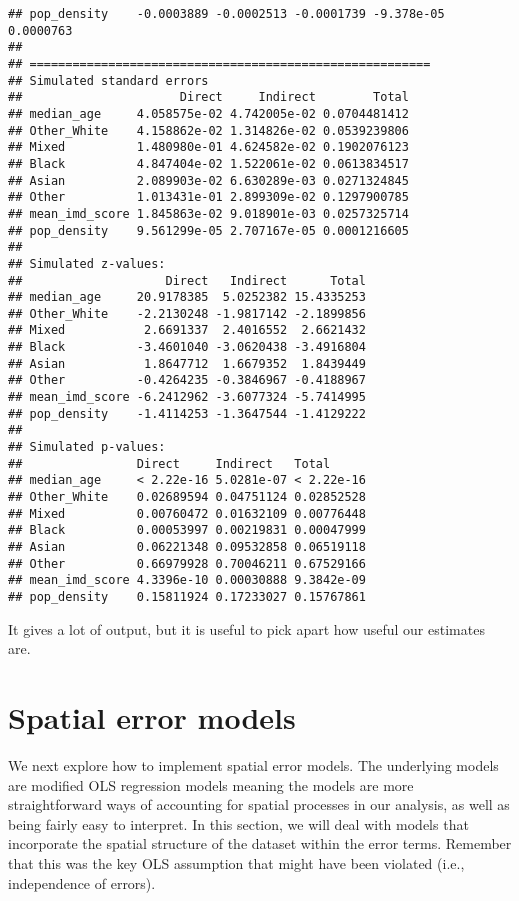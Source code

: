 \documentclass[
]{book}
\begin{document}
\begin{verbatim}
## pop_density    -0.0003889 -0.0002513 -0.0001739 -9.378e-05  0.0000763
## 
## ========================================================
## Simulated standard errors
##                      Direct     Indirect        Total
## median_age     4.058575e-02 4.742005e-02 0.0704481412
## Other_White    4.158862e-02 1.314826e-02 0.0539239806
## Mixed          1.480980e-01 4.624582e-02 0.1902076123
## Black          4.847404e-02 1.522061e-02 0.0613834517
## Asian          2.089903e-02 6.630289e-03 0.0271324845
## Other          1.013431e-01 2.899309e-02 0.1297900785
## mean_imd_score 1.845863e-02 9.018901e-03 0.0257325714
## pop_density    9.561299e-05 2.707167e-05 0.0001216605
## 
## Simulated z-values:
##                    Direct   Indirect      Total
## median_age     20.9178385  5.0252382 15.4335253
## Other_White    -2.2130248 -1.9817142 -2.1899856
## Mixed           2.6691337  2.4016552  2.6621432
## Black          -3.4601040 -3.0620438 -3.4916804
## Asian           1.8647712  1.6679352  1.8439449
## Other          -0.4264235 -0.3846967 -0.4188967
## mean_imd_score -6.2412962 -3.6077324 -5.7414995
## pop_density    -1.4114253 -1.3647544 -1.4129222
## 
## Simulated p-values:
##                Direct     Indirect   Total     
## median_age     < 2.22e-16 5.0281e-07 < 2.22e-16
## Other_White    0.02689594 0.04751124 0.02852528
## Mixed          0.00760472 0.01632109 0.00776448
## Black          0.00053997 0.00219831 0.00047999
## Asian          0.06221348 0.09532858 0.06519118
## Other          0.66979928 0.70046211 0.67529166
## mean_imd_score 4.3396e-10 0.00030888 9.3842e-09
## pop_density    0.15811924 0.17233027 0.15767861
\end{verbatim}

It gives a lot of output, but it is useful to pick apart how useful our estimates are.

\hypertarget{spatial-error-models}{%
\section{Spatial error models}\label{spatial-error-models}}

We next explore how to implement spatial error models. The underlying models are modified OLS regression models meaning the models are more straightforward ways of accounting for spatial processes in our analysis, as well as being fairly easy to interpret. In this section, we will deal with models that incorporate the spatial structure of the dataset within the error terms. Remember that this was the key OLS assumption that might have been violated (i.e., independence of errors).
\end{document}
